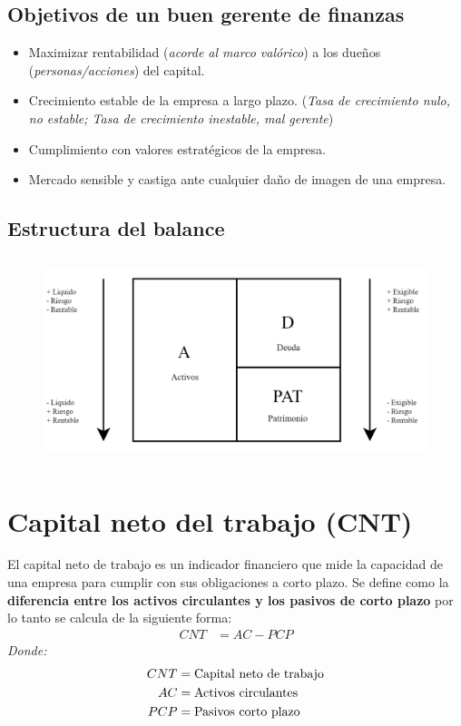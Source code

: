\documentclass{templateNote}
\begin{document}
\subsection{Objetivos de un buen gerente de finanzas}
\begin{itemize}
    \item Maximizar rentabilidad (\textit{acorde al marco valórico}) a los dueños (\textit{personas/acciones}) del capital.
    \item Crecimiento estable de la empresa a largo plazo. (\textit{Tasa de crecimiento nulo, no estable; Tasa de crecimiento inestable, mal gerente})
    \item Cumplimiento con valores estratégicos de la empresa.
    \item Mercado sensible y castiga ante cualquier daño de imagen de una empresa.
\end{itemize}

\subsection{Estructura del balance}
\begin{figure}[H]
    \centering
    \includegraphics[height=6cm]{img/estrucBalance.png}
\end{figure}
\newpage

\section{Capital neto del trabajo (CNT)}\label{sec:Capital neto del trabajo (CNT)}
\noindent El capital neto de trabajo es un indicador financiero que mide la capacidad de una empresa para cumplir con sus obligaciones a corto plazo. Se define como la \textbf{diferencia entre los activos circulantes y los pasivos de corto plazo} por lo tanto se calcula de la siguiente forma:
\begin{align*}
    CNT &= AC - PCP
\end{align*}
\textit{Donde:}
\begin{align*}
    CNT &= \textnormal{Capital neto de trabajo}\\
    AC &= \textnormal{Activos circulantes}\\
    PCP &= \textnormal{Pasivos corto plazo}
\end{align*}
\end{document}
